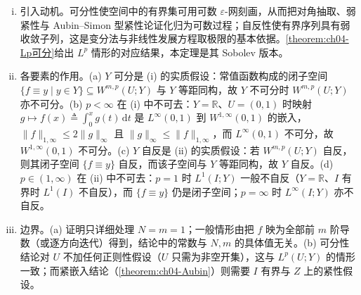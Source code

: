 \documentclass[../../main.tex]{subfiles}%
\begin{document}
\begin{remark}\label{remark:ch04-Sobolev可分自反动机}
\begin{enumerate}[(i)]
\item 引入动机。可分性使空间中的有界集可用可数 $\varepsilon$-网刻画，从而把对角抽取、弱紧性与 Aubin--Simon 型紧性论证化归为可数过程；自反性使有界序列具有弱收敛子列，这是变分法与非线性发展方程取极限的基本依据。\cref{theorem:ch04-Lp可分}给出 $L^p$ 情形的对应结果，本定理是其 Sobolev 版本。

\item 各要素的作用。(a) $Y$ 可分是 (i) 的实质假设：常值函数构成的闭子空间 $\{f\equiv y\mid y\in Y\}\subseteq W^{m,p}(U;Y)$ 与 $Y$ 等距同构，故 $Y$ 不可分时 $W^{m,p}(U;Y)$ 亦不可分。(b) $p<\infty$ 在 (i) 中不可去：$Y=\mathbb{R}$、$U=(0,1)$ 时映射 $g\mapsto f(x)\triangleq\int_0^xg(t)\,\mathrm{d}t$ 是 $L^\infty(0,1)$ 到 $W^{1,\infty}(0,1)$ 的嵌入，$\|f\|_{1,\infty}\leqslant2\|g\|_\infty$ 且 $\|g\|_\infty\leqslant\|f\|_{1,\infty}$，而 $L^\infty(0,1)$ 不可分，故 $W^{1,\infty}(0,1)$ 不可分。(c) $Y$ 自反是 (ii) 的实质假设：若 $W^{m,p}(U;Y)$ 自反，则其闭子空间 $\{f\equiv y\}$ 自反，而该子空间与 $Y$ 等距同构，故 $Y$ 自反。(d) $p\in(1,\infty)$ 在 (ii) 中不可去：$p=1$ 时 $L^1(I;Y)$ 一般不自反（$Y=\mathbb{R}$、$I$ 有界时 $L^1(I)$ 不自反），而 $\{f\equiv y\}$ 仍是闭子空间；$p=\infty$ 时 $L^\infty(I;Y)$ 亦不自反。

\item 边界。(a) 证明只详细处理 $N=m=1$；一般情形由把 $f$ 映为全部前 $m$ 阶导数（或逐方向迭代）得到，结论中的常数与 $N,m$ 的具体值无关。(b) 可分性结论对 $U$ 不加任何正则性假设（$U$ 只需为非空开集），这与 $L^p(U;Y)$ 的情形一致；而紧嵌入结论（\cref{theorem:ch04-Aubin}）则需要 $I$ 有界与 $Z$ 上的紧性假设。
\end{enumerate}
\end{remark}
\end{document}
